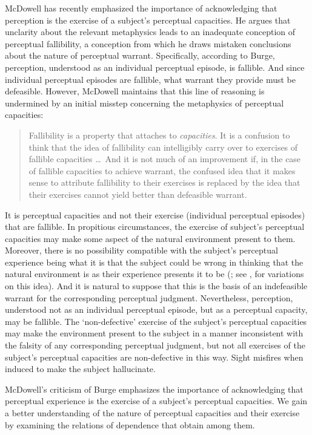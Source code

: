 \documentclass[12pt]{article}
\begin{document}
McDowell has recently emphasized the importance of acknowledging that perception is the exercise of a subject's perceptual capacities. He argues that unclarity about the relevant metaphysics leads \citet{Burge:2005uq} to an inadequate conception of perceptual fallibility, a conception from which he draws mistaken conclusions about the nature of perceptual warrant. Specifically, according to Burge, perception, understood as an individual perceptual episode, is fallible. And since individual perceptual episodes are fallible, what warrant they provide must be defeasible. However, McDowell maintains that this line of reasoning is undermined by an initial misstep concerning the metaphysics of perceptual capacities:
\begin{quote}
	Fallibility is a property that attaches to \emph{capacities}. It is a confusion to think that the idea of fallibility can intelligibly carry over to exercises of fallible capacities \ldots\ And it is not much of an improvement if, in the case of fallible capacities to achieve warrant, the confused idea that it makes sense to attribute fallibility to their exercises is replaced by the idea that their exercises cannot yield better than defeasible warrant. \citep[245]{McDowell:2010fk}
\end{quote}
It is perceptual capacities and not their exercise (individual perceptual episodes) that are fallible. In propitious circumstances, the exercise of subject's perceptual capacities may make some aspect of the natural environment present to them. Moreover, there is no possibility compatible with the subject's perceptual experience being what it is that the subject could be wrong in thinking that the natural environment is as their experience presents it to be (\citealt[245]{McDowell:2010fk}; see  \citealt{Johnston:2006uq}, \citealt{Kalderon:2011fk} for variations on this idea). And it is natural to suppose that this is the basis of an indefeasible warrant for the corresponding perceptual judgment. Nevertheless, perception, understood not as an individual perceptual episode, but as a perceptual capacity, may be fallible. The `non-defective' exercise of the subject's perceptual capacities may make the environment present to the subject in a manner inconsistent with the falsity of any corresponding perceptual judgment, but not all exercises of the subject's perceptual capacities are non-defective in this way. Sight misfires when induced to make the subject hallucinate.

McDowell's criticism of Burge emphasizes the importance of acknowledging that perceptual experience is the exercise of a subject's perceptual capacities. We gain a better understanding of the nature of perceptual capacities and their exercise by examining the relations of dependence that obtain among them.
\end{document}

